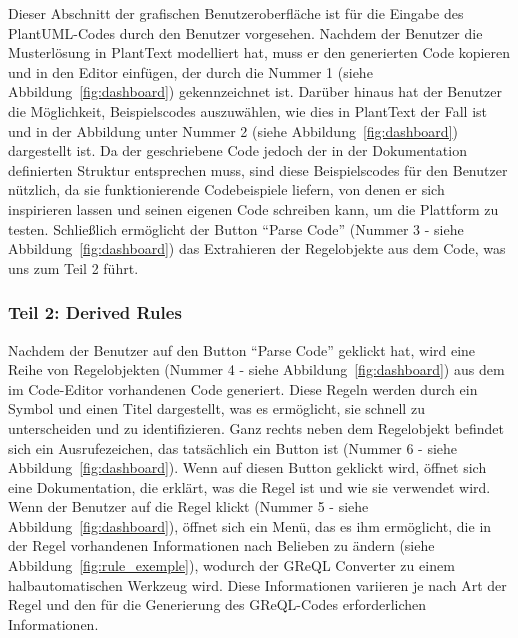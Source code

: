 Dieser Abschnitt der grafischen Benutzeroberfläche ist für die Eingabe des PlantUML-Codes durch den Benutzer vorgesehen.
Nachdem der Benutzer die Musterlösung in PlantText modelliert hat, muss er den generierten Code kopieren und in den
Editor einfügen, der durch die Nummer 1 (siehe Abbildung~\ref{fig:dashboard}) gekennzeichnet ist. Darüber hinaus hat der Benutzer die
Möglichkeit, Beispielscodes auszuwählen, wie dies in PlantText der Fall ist und in der Abbildung unter Nummer 2 (siehe Abbildung~\ref{fig:dashboard})
dargestellt ist. Da der geschriebene Code jedoch der in der Dokumentation definierten Struktur entsprechen muss, sind
diese Beispielscodes für den Benutzer nützlich, da sie funktionierende Codebeispiele liefern, von denen er sich
inspirieren lassen und seinen eigenen Code schreiben kann, um die Plattform zu testen. Schließlich ermöglicht der
Button ``Parse Code'' (Nummer 3 - siehe Abbildung~\ref{fig:dashboard}) das Extrahieren der Regelobjekte aus dem Code, was uns zum
Teil 2 führt.

\subsubsection{Teil 2: Derived Rules}

Nachdem der Benutzer auf den Button ``Parse Code'' geklickt hat, wird eine Reihe von Regelobjekten
(Nummer 4 - siehe Abbildung~\ref{fig:dashboard}) aus dem im Code-Editor vorhandenen Code generiert. Diese Regeln werden durch ein
Symbol und einen Titel dargestellt, was es ermöglicht, sie schnell zu unterscheiden und zu identifizieren. Ganz rechts
neben dem Regelobjekt befindet sich ein Ausrufezeichen, das tatsächlich ein Button ist (Nummer 6 - siehe Abbildung~\ref{fig:dashboard}).
Wenn auf diesen Button geklickt wird, öffnet sich eine Dokumentation, die erklärt, was die Regel ist und wie sie
verwendet wird. Wenn der Benutzer auf die Regel klickt (Nummer 5 - siehe Abbildung~\ref{fig:dashboard}), öffnet sich ein Menü,
das es ihm ermöglicht, die in der Regel vorhandenen Informationen nach Belieben zu ändern (siehe Abbildung~\ref{fig:rule_exemple}),
wodurch der \gls{GReQL Converter} zu einem halbautomatischen Werkzeug wird. Diese Informationen variieren je nach Art der Regel
und den für die Generierung des GReQL-Codes erforderlichen Informationen.


